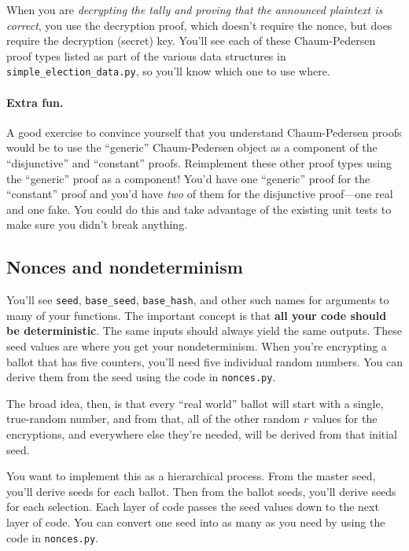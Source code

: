 \documentclass[letterpaper,12pt]{article}
\begin{document}
When you are {\em decrypting the tally and proving that the announced
  plaintext is correct}, you use the decryption proof, which doesn't
require the nonce, but does require the decryption (secret) key.
You'll see each of these Chaum-Pedersen proof types listed as part
of the various data structures in {\tt simple\_election\_data.py},
so you'll know which one to use where.

\paragraph{Extra fun.} A good exercise to convince
yourself that you understand Chaum-Pedersen proofs would be to use the
``generic'' Chaum-Pedersen object as a component of the
``disjunctive'' and ``constant'' proofs. Reimplement these other proof
types using the ``generic'' proof as a component! You'd have one
``generic'' proof for the ``constant'' proof and you'd have {\em two}
of them for the disjunctive proof---one real and one fake. You could
do this and take advantage of the existing unit tests to make sure you
didn't break anything.

\subsection{Nonces and nondeterminism}
\label{sec:nonces}
You'll see {\tt seed}, {\tt base\_seed}, {\tt base\_hash}, and other
such names for arguments to many of your functions. The important
concept is that {\bf all your code should be deterministic}. The same
inputs should always yield the same outputs. These seed values are
where you get your nondeterminism. When you're encrypting a ballot
that has five counters, you'll need five individual random numbers.
You can derive them from the seed using the code in {\tt nonces.py}. 

The broad idea, then, is that every ``real world'' ballot will start
with a single, true-random number, and from that, all of the other
random $r$ values for the encryptions, and everywhere else they're
needed, will be derived from that initial seed.

You want to implement this as a hierarchical process. From the master
seed, you'll derive seeds for each ballot. Then from the ballot seeds,
you'll derive seeds for each selection. Each layer of code passes the seed
values down to the next layer of code. You can convert one seed into
as many as you need by using the code in {\tt nonces.py}.
\end{document}
